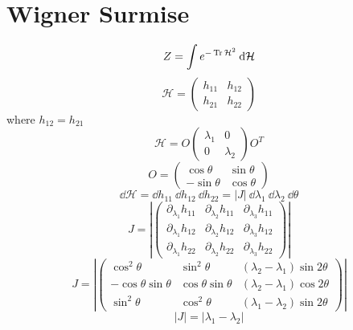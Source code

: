 \documentclass[a4,10pt,titlepage]{article}
\renewcommand\[{\begin{equation*}}
\renewcommand\]{\end{equation*}}
\newcommand{\be}{\begin{equation}}
\newcommand{\ee}{\end{equation}}
\numberwithin{equation}{section}
\newcommand{\lp}{\left}
\newcommand{\rp}{\right}
\newcommand{\ham}{\mathcal{H}}
\begin{document}
\section{Wigner Surmise}
\be
Z=\int e^{-\Tr \ham^2}\:\dd \ham
\ee
\be
\ham =
\begin{pmatrix}
h_{11} & h_{12}\\
h_{21} & h_{22}
\end{pmatrix}
\ee
where $h_{12}=h_{21}$
\be
\ham=O\begin{pmatrix}
\lambda_1 & 0\\
0 & \lambda_2
\end{pmatrix}O^T
\ee
\be
O=\begin{pmatrix}
\cos \theta & \sin\theta\\
-\sin\theta & \cos \theta
\end{pmatrix}
\ee
\be
\dd\ham=\dd h_{11}\:\dd h_{12}\:\dd h_{22}=|J|\:\dd\lambda_1\:\dd \lambda_2\:\dd \theta
\ee
\be
J=\lp| \begin{pmatrix}\partial_{\lambda_1}h_{11} & \partial_{\lambda_2}h_{11} & \partial_{\lambda_3}h_{11} \\
\partial_{\lambda_1}h_{12} & \partial_{\lambda_2}h_{12} & \partial_{\lambda_3}h_{12}
\\
\partial_{\lambda_1}h_{22} & \partial_{\lambda_2}h_{22} & \partial_{\lambda_3}h_{22} 

\end{pmatrix} \rp|
\ee
\[
J=\lp| \begin{pmatrix}
\cos^2\theta & \sin^2\theta & (\lambda_2-\lambda_1)\sin2\theta \\
-\cos\theta\sin\theta& \cos\theta \sin\theta & (\lambda_2-\lambda_1)\cos2\theta
\\
 \sin^2\theta &\cos^2\theta & (\lambda_1-\lambda_2)\sin2\theta
\end{pmatrix} \rp|
\]
\be
|J|=|\lambda_1-\lambda_2|
\ee
\end{document}
